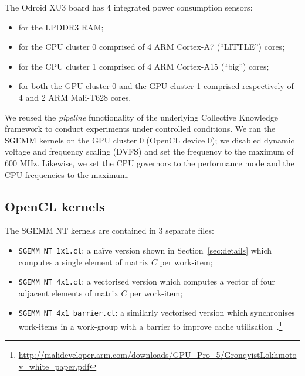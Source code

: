\documentclass{acm_proc_article-sp} %
\begin{document}
The Odroid XU3 board has 4 integrated power consumption sensors:
%
\begin{itemize}

  \item for the LPDDR3 RAM;

  \item for the CPU cluster 0 comprised of 4 ARM Cortex-A7 (``LITTLE'') cores;

  \item for the CPU cluster 1 comprised of 4 ARM Cortex-A15 (``big'') cores;

  \item for both the GPU cluster 0 and the GPU cluster 1 comprised respectively
  of 4 and 2 ARM Mali-T628 cores.

\end{itemize}
%
We reused the {\em pipeline} functionality of the underlying Collective
Knowledge framework to conduct experiments under controlled conditions.
%
We ran the SGEMM kernels on the GPU cluster 0 (OpenCL device 0); we disabled
dynamic voltage and frequency scaling (DVFS) and set the frequency to the
maximum of 600 MHz.
%
Likewise, we set the CPU governors to the performance mode and the CPU
frequencies to the maximum.
%

\subsection{OpenCL kernels}

The SGEMM NT kernels are contained in 3 separate files:
%
\begin{itemize}

  \item \verb|SGEMM_NT_1x1.cl|: a na\"ive version shown in
  Section~\ref{sec:details} which computes a single element of matrix $C$ per
  work-item;

  \item \verb|SGEMM_NT_4x1.cl|: a vectorised version which computes a vector of
  four adjacent elements of matrix $C$ per work-item;

  \item \verb|SGEMM_NT_4x1_barrier.cl|: a similarly vectorised version which
  synchronises work-items in a work-group with a barrier to improve cache
  utilisation~\cite{Gronqvist:2014}.\footnote{\url{http://malideveloper.arm.com/downloads/GPU_Pro_5/GronqvistLokhmotov_white_paper.pdf}}

\end{itemize}
%
\end{document}
